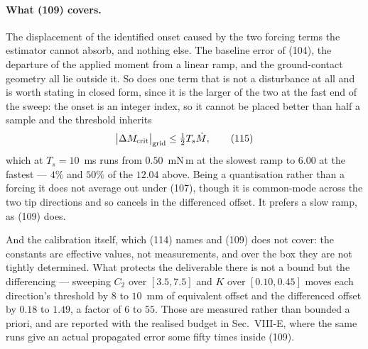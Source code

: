 \documentclass[10pt]{article}
\begin{document}
\paragraph{What (109) covers.}
The displacement of the identified onset caused by the two forcing terms
the estimator cannot absorb, and nothing else. The baseline error of
(104), the departure of the applied moment from a linear ramp, and the
ground-contact geometry all lie outside it. So does one term that is
not a disturbance at all and is worth stating in closed form, since it
is the larger of the two at the fast end of the sweep: the onset is an
integer index, so it cannot be placed better than half a sample and the
threshold inherits
\begin{equation}
  \bigl|\Delta M_{\rm crit}\bigr|_{\rm grid} \le \tfrac12 T_s\dot M ,
  \tag{115}
\end{equation}
which at $T_s = 10$~ms runs from $0.50$~mN\,m at the slowest ramp to
$6.00$ at the fastest --- $4\%$ and $50\%$ of the $12.04$ above. Being a
quantisation rather than a forcing it does not average out under (107),
though it is common-mode across the two tip directions and so cancels
in the differenced offset. It prefers a slow ramp, as (109) does.

And the calibration itself, which (114) names and (109) does not cover:
the constants are effective values, not measurements, and over the box
they are not tightly determined. What protects the deliverable there is
not a bound but the differencing --- sweeping $C_2$ over $[3.5, 7.5]$
and $K$ over $[0.10, 0.45]$ moves each direction's threshold by $8$ to
$10$~mm of equivalent offset and the differenced offset by $0.18$ to
$1.49$, a factor of $6$ to $55$. Those are measured rather
than bounded a priori, and are reported with the realised budget in
Sec.~VIII-E, where the same runs give an actual propagated error some
fifty times inside (109).
\end{document}
